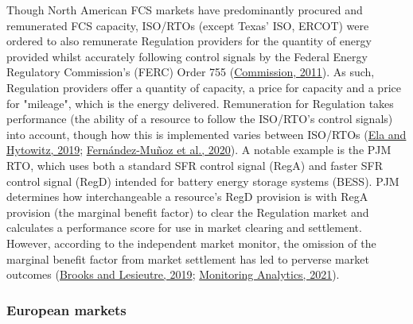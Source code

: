 \documentclass[12pt,a4paper,]{report}
\begin{document}
Though North American FCS markets have predominantly procured and
remunerated FCS capacity, ISO/RTOs (except Texas' ISO, ERCOT) were
ordered to also remunerate Regulation providers for the quantity of
energy provided whilst accurately following control signals by the
Federal Energy Regulatory Commission's (FERC) Order 755
(\protect\hyperlink{ref-federalenergyregulatorycommissionfercOrderNo7552011}{Commission,
2011}). As such, Regulation providers offer a quantity of capacity, a
price for capacity and a price for "mileage", which is the energy
delivered. Remuneration for Regulation takes performance (the ability of
a resource to follow the ISO/RTO's control signals) into account, though
how this is implemented varies between ISO/RTOs
(\protect\hyperlink{ref-elaAncillaryServicesUnited2019}{Ela and
Hytowitz, 2019};
\protect\hyperlink{ref-fernandez-munozFastFrequencyControl2020}{Fernández-Muñoz
et al., 2020}). A notable example is the PJM RTO, which uses both a
standard SFR control signal (RegA) and faster SFR control signal (RegD)
intended for battery energy storage systems (BESS). PJM determines how
interchangeable a resource's RegD provision is with RegA provision (the
marginal benefit factor) to clear the Regulation market and calculates a
performance score for use in market clearing and settlement. However,
according to the independent market monitor, the omission of the
marginal benefit factor from market settlement has led to perverse
market outcomes
(\protect\hyperlink{ref-brooksReviewFrequencyRegulation2019}{Brooks and
Lesieutre, 2019};
\protect\hyperlink{ref-monitoringanalytics2021QuarterlyState2021}{Monitoring
Analytics, 2021}).

\hypertarget{sec:fcs-EU}{%
\subsubsection{European markets}\label{sec:fcs-EU}}
\end{document}
